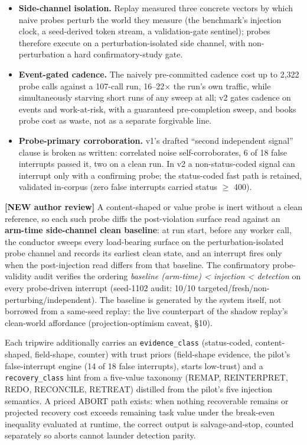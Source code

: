 \documentclass[acmsmall,screen,review,anonymous]{acmart}
\renewenvironment{leftbar}{%
  \def\FrameCommand{\hspace{2pt}{\color{lbcol}\vrule width 1.5pt}\hspace{8pt}}%
  \MakeFramed{\advance\hsize-\width \FrameRestore}\small}%
  {\endMakeFramed}
\begin{document}
\begin{itemize}
  \item \textbf{Side-channel isolation.} Replay measured three concrete vectors by which naive probes perturb the world they measure (the benchmark's injection clock, a seed-derived token stream, a validation-gate sentinel); probes therefore execute on a perturbation-isolated side channel, with non-perturbation a hard confirmatory-study gate.
  \item \textbf{Event-gated cadence.} The naively pre-committed cadence cost up to 2,322 probe calls against a 107-call run, 16--22$\times$ the run's own traffic, while simultaneously starving short runs of any sweep at all; v2 gates cadence on events and work-at-risk, with a guaranteed pre-completion sweep, and books probe cost as waste, not as a separate forgivable line.
  \item \textbf{Probe-primary corroboration.} v1's drafted ``second independent signal'' clause is broken as written: correlated noise self-corroborates, 6 of 18 false interrupts passed it, two on a clean run. In v2 a non-status-coded signal can interrupt only with a confirming probe; the status-coded fast path is retained, validated in-corpus (zero false interrupts carried status $\ge$ 400).
\end{itemize}
\begin{leftbar}
\textbf{[NEW \textperiodcentered{} author review]} A content-shaped or value probe is inert without a clean reference, so each such probe diffs the post-violation surface read against an \textbf{arm-time side-channel clean baseline}: at run start, before any worker call, the conductor sweeps every load-bearing surface on the perturbation-isolated probe channel and records its earliest clean state, and an interrupt fires only when the post-injection read differs from that baseline. The confirmatory probe-validity audit verifies the ordering \emph{baseline (arm-time) < injection < detection} on every probe-driven interrupt (seed-1102 audit: 10/10 targeted/fresh/non-perturbing/independent). The baseline is generated by the system itself, not borrowed from a same-seed replay: the live counterpart of the shadow replay's clean-world affordance (projection-optimism caveat, \S10).

\end{leftbar}
Each tripwire additionally carries an \texttt{evidence\_class} (status-coded, content-shaped, field-shape, counter) with trust priors (field-shape evidence, the pilot's false-interrupt engine (14 of 18 false interrupts), starts low-trust) and a \texttt{recovery\_class} hint from a five-value taxonomy (REMAP, REINTERPRET, REDO, RECONCILE, RETREAT) distilled from the pilot's five injection semantics. A priced ABORT path exists: when nothing recoverable remains or projected recovery cost exceeds remaining task value under the break-even inequality evaluated at runtime, the correct output is salvage-and-stop, counted separately so aborts cannot launder detection parity.
\end{document}

